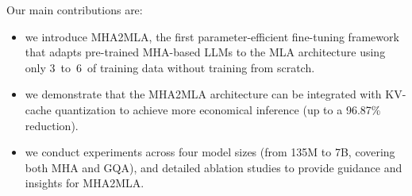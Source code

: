 



Our main contributions are:
\begin{itemize}[leftmargin=*,itemsep=0pt, topsep=0pt, parsep=0pt]
    \item we introduce MHA2MLA, the first parameter-efficient fine-tuning framework that adapts pre-trained MHA-based LLMs to the MLA architecture using only 3\textperthousand~to~6\textperthousand~of training data without training from scratch.
    \item we demonstrate that the MHA2MLA architecture can be integrated with KV-cache quantization to achieve more economical inference (up to a 96.87\% reduction).
    \item we conduct experiments across four model sizes (from 135M to 7B, covering both MHA and GQA), and detailed ablation studies to provide guidance and insights for MHA2MLA.
\end{itemize}


